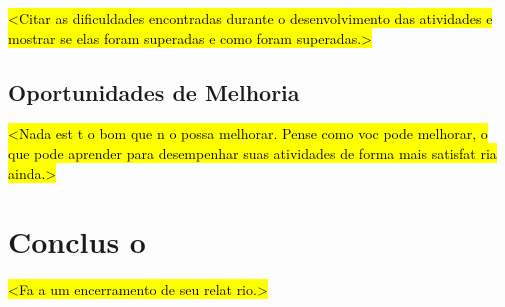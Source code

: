 \documentclass{article}
\begin{document}
\hl{<Citar as dificuldades encontradas durante o desenvolvimento das atividades e mostrar se elas foram superadas e como foram superadas.>}

\subsection*{Oportunidades de Melhoria}

\hl{<Nada est  t o bom que n o possa melhorar. Pense como voc  pode melhorar, o que pode aprender para desempenhar suas atividades de forma mais satisfat ria ainda.>}


\section*{Conclus o}

\hl{<Fa a um encerramento de seu relat rio.>}
\end{document}

